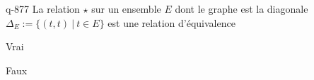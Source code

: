 \begin{truefalse}{q-877}
La relation $\star$ sur un ensemble $E$ dont le graphe est la diagonale $\Delta_E:=\{(t,t)\:|\: t\in E\}$ est une relation d'équivalence
\item* Vrai
\item Faux
\end{truefalse}


